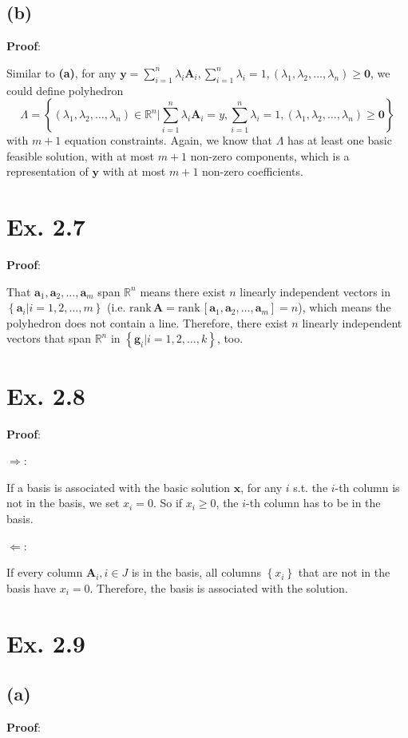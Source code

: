 \documentclass[12pt]{article}
\begin{document}
\subsection*{(b)}
\textbf{Proof}:

Similar to \textbf{(a)}, for any $\bm{y}=\sum_{i=1}^n \lambda_i\bm{A}_i,\sum_{i=1}^n \lambda_i=1,(\lambda_1,\lambda_2,\ldots,\lambda_n)\ge\bm{0}$, we could define polyhedron $$\Lambda=\left\{(\lambda_1,\lambda_2,\ldots,\lambda_n)\in\mathbb{R}^n\Big|\sum_{i=1}^n \lambda_i\bm{A}_i=y,\sum_{i=1}^n \lambda_i=1,(\lambda_1,\lambda_2,\ldots,\lambda_n)\ge\bm{0}\right\}$$ with $m+1$ equation constraints. Again, we know that $\Lambda$ has at least one basic feasible solution, with at most $m+1$ non-zero components, which is a representation of $\bm{y}$ with at most $m+1$ non-zero coefficients.

\section*{Ex. 2.7}
\textbf{Proof}:

That $\bm{a}_1,\bm{a}_2,\ldots,\bm{a}_m$ span $\mathbb{R}^n$ means there exist $n$ linearly independent vectors in $\left\{\bm{a}_i\big|i=1,2,\ldots,m\right\}$ (i.e. $\text{rank}\,\bm{A}=\text{rank}\,[\bm{a}_1,\bm{a}_2,\ldots,\bm{a}_m]=n$), which means the polyhedron does not contain a line. Therefore, there exist $n$ linearly independent vectors that span $\mathbb{R}^n$ in $\left\{\bm{g}_i\big|i=1,2,\ldots,k\right\}$, too.

\section*{Ex. 2.8}
\textbf{Proof}:

$\Rightarrow$:

If a basis is associated with the basic solution $\bm{x}$, for any $i$ s.t. the $i$-th column is not in the basis, we set $x_i=0$. So if $x_i\ge 0$, the $i$-th column has to be in the basis.

$\Leftarrow$:

If every column $\bm{A}_i,i\in J$ is in the basis, all columns $\left\{x_i\right\}$ that are not in the basis have $x_i=0$. Therefore, the basis is associated with the solution.

\section*{Ex. 2.9}
\subsection*{(a)}
\textbf{Proof}:
\end{document}
